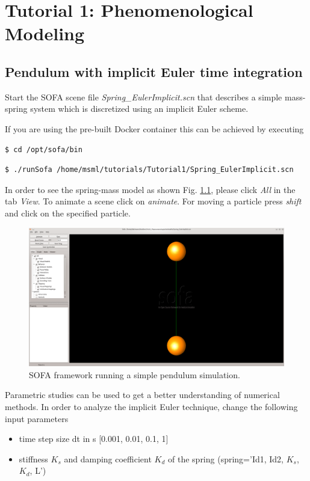 \chapter{Tutorial 1: Phenomenological Modeling}  

\section{Pendulum with implicit Euler time integration}

Start the SOFA scene file \emph{Spring\_EulerImplicit.scn} that describes a simple mass-spring system which is discretized using an implicit Euler scheme.

If you are using the pre-built Docker container this can be achieved by executing
\begin{lstlisting}[language=sh, breaklines=true]
$ cd /opt/sofa/bin 
\end{lstlisting}

\begin{lstlisting}[language=sh, breaklines=true]
$ ./runSofa /home/msml/tutorials/Tutorial1/Spring_EulerImplicit.scn
\end{lstlisting}

In order to see the spring-mass model as shown Fig. \ref{PendulumScreenshot}, please click \emph{All} in the tab \emph{View}. To animate a scene click on \emph{animate}. For moving a particle press \emph{shift} and click on the specified particle.

\begin{figure}[h]
  	\centering
    \includegraphics[width=\textwidth]{pictures/sofa_screenshot.png}
    \caption{SOFA framework running a simple pendulum simulation.}
    \label{PendulumScreenshot}
\end{figure}

Parametric studies can be used to get a better understanding of numerical methods. In order to analyze the implicit Euler technique, change the following input parameters
\begin{itemize}
	\item time step size dt in s [0.001, 0.01, 0.1, 1]
	\item stiffness $K_s$ and damping coefficient $K_d$ of the spring (spring='Id1, Id2, $K_s$, $K_d$, L')
\end{itemize}

